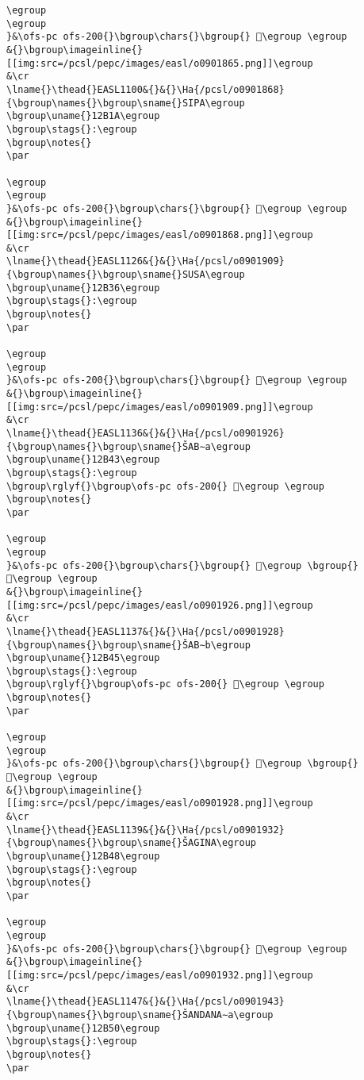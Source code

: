 \begin{verbatim}
\egroup
\egroup
}&\ofs-pc ofs-200{}\bgroup\chars{}\bgroup{} 𒬗\egroup \egroup
&{}\bgroup\imageinline{}[[img:src=/pcsl/pepc/images/easl/o0901865.png]]\egroup
&\cr
\lname{}\thead{}EASL1100&{}&{}\Ha{/pcsl/o0901868}{\bgroup\names{}\bgroup\sname{}SIPA\egroup
\bgroup\uname{}12B1A\egroup
\bgroup\stags{}:\egroup
\bgroup\notes{}
\par 

\egroup
\egroup
}&\ofs-pc ofs-200{}\bgroup\chars{}\bgroup{} 𒬚\egroup \egroup
&{}\bgroup\imageinline{}[[img:src=/pcsl/pepc/images/easl/o0901868.png]]\egroup
&\cr
\lname{}\thead{}EASL1126&{}&{}\Ha{/pcsl/o0901909}{\bgroup\names{}\bgroup\sname{}SUSA\egroup
\bgroup\uname{}12B36\egroup
\bgroup\stags{}:\egroup
\bgroup\notes{}
\par 

\egroup
\egroup
}&\ofs-pc ofs-200{}\bgroup\chars{}\bgroup{} 𒬶\egroup \egroup
&{}\bgroup\imageinline{}[[img:src=/pcsl/pepc/images/easl/o0901909.png]]\egroup
&\cr
\lname{}\thead{}EASL1136&{}&{}\Ha{/pcsl/o0901926}{\bgroup\names{}\bgroup\sname{}ŠAB∼a\egroup
\bgroup\uname{}12B43\egroup
\bgroup\stags{}:\egroup
\bgroup\rglyf{}\bgroup\ofs-pc ofs-200{} 𒭃\egroup \egroup
\bgroup\notes{}
\par 

\egroup
\egroup
}&\ofs-pc ofs-200{}\bgroup\chars{}\bgroup{} 𒭂\egroup \bgroup{} 𒭃\egroup \egroup
&{}\bgroup\imageinline{}[[img:src=/pcsl/pepc/images/easl/o0901926.png]]\egroup
&\cr
\lname{}\thead{}EASL1137&{}&{}\Ha{/pcsl/o0901928}{\bgroup\names{}\bgroup\sname{}ŠAB∼b\egroup
\bgroup\uname{}12B45\egroup
\bgroup\stags{}:\egroup
\bgroup\rglyf{}\bgroup\ofs-pc ofs-200{} 𒭅\egroup \egroup
\bgroup\notes{}
\par 

\egroup
\egroup
}&\ofs-pc ofs-200{}\bgroup\chars{}\bgroup{} 𒭄\egroup \bgroup{} 𒭅\egroup \egroup
&{}\bgroup\imageinline{}[[img:src=/pcsl/pepc/images/easl/o0901928.png]]\egroup
&\cr
\lname{}\thead{}EASL1139&{}&{}\Ha{/pcsl/o0901932}{\bgroup\names{}\bgroup\sname{}ŠAGINA\egroup
\bgroup\uname{}12B48\egroup
\bgroup\stags{}:\egroup
\bgroup\notes{}
\par 

\egroup
\egroup
}&\ofs-pc ofs-200{}\bgroup\chars{}\bgroup{} 𒭈\egroup \egroup
&{}\bgroup\imageinline{}[[img:src=/pcsl/pepc/images/easl/o0901932.png]]\egroup
&\cr
\lname{}\thead{}EASL1147&{}&{}\Ha{/pcsl/o0901943}{\bgroup\names{}\bgroup\sname{}ŠANDANA∼a\egroup
\bgroup\uname{}12B50\egroup
\bgroup\stags{}:\egroup
\bgroup\notes{}
\par 


\end{verbatim}
